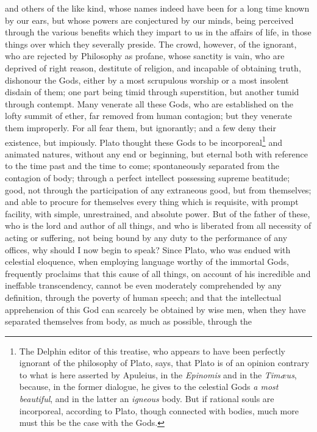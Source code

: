 \documentclass{article}
\begin{document}
\noindent and others of the like kind, whose names indeed have been for a long
time known by our ears, but whose powers are conjectured by our minds, being
perceived through the various benefits which they impart to us in the affairs
of life, in those things over which they severally preside. The crowd, however,
of the ignorant, who are rejected by Philosophy as profane, whose sanctity is
vain, who are deprived of right reason, destitute of religion, and incapable of
obtaining truth, dishonour the Gods, either by a most scrupulous worship or a
most insolent disdain of them; one part being timid through superstition, but
another tumid through contempt. Many venerate all these Gods, who are
established on the lofty summit of ether, far removed from human contagion; but
they venerate them improperly. For all fear them, but ignorantly; and a few
deny their existence, but impiously. Plato thought these Gods to be
incorporeal\footnote{The Delphin editor of this treatise, who appears to have
been perfectly ignorant of the philosophy of Plato, says, that Plato is of an
opinion contrary to what is here asserted by Apuleius, in the \textit{Epinomis}
and in the \textit{Tim{\ae}us}, because, in the former dialogue, he gives to
the celestial Gods \textit{a most beautiful}, and in the latter an
\textit{igneous} body. But if rational souls are incorporeal, according to
Plato, though connected with bodies, much more must this be the case with the
Gods.} and animated natures, without any end or beginning, but eternal both
with reference to the time past and the time to come; spontaneously separated
from the contagion of body; through a perfect intellect possessing supreme
beatitude; good, not through the participation of any extraneous good, but from
themselves; and able to procure for themselves every thing which is requisite,
with prompt facility, with simple, unrestrained, and absolute power. But of the
father of these, who is the lord and author of all things, and who is liberated
from all necessity of acting or suffering, not being bound by any duty to the
performance of any offices, why should I now begin to speak? Since Plato, who
was endued with celestial eloquence, when employing language worthy of the
immortal Gods, frequently proclaims that this cause of all things, on account
of his incredible and ineffable transcendency, cannot be even moderately
comprehended by any definition, through the poverty of human speech; and that
the intellectual apprehension of this God can scarcely be obtained by wise men,
when they have separated themselves from body, as much as possible, through the
\end{document}
